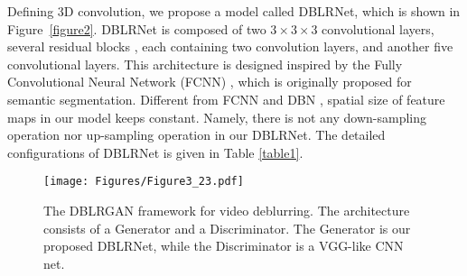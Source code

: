 \documentclass[journal]{IEEEtran}
\begin{document}
Defining 3D convolution, we propose a model called DBLRNet, which is shown in Figure~\ref{figure2}. DBLRNet is composed of two $3 \times 3 \times 3$ convolutional layers, several residual blocks \cite{he2016deep}, each containing two convolution layers, and another five convolutional layers. This architecture is designed inspired by the Fully Convolutional Neural Network (FCNN) \cite{long2015fully}, which is originally proposed for semantic segmentation. Different from FCNN and DBN \cite{su2016deep}, spatial size of feature maps in our model keeps constant. Namely, there is not any down-sampling operation nor up-sampling operation in our DBLRNet. The detailed configurations of DBLRNet is given in Table \ref{table1}.

\begin{figure*}
	\centering
	\texttt{[image: Figures/Figure3\_23.pdf]}
    \caption{The DBLRGAN framework for video deblurring. The architecture consists of a Generator and a Discriminator. The Generator is our proposed DBLRNet, while the Discriminator is a VGG-like CNN net.}
	\label{figure3}
\end{figure*}
\end{document}
